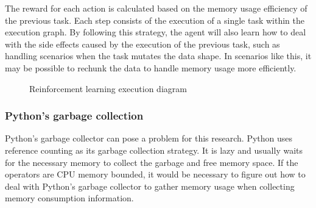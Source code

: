 The reward for each action is calculated based on the memory usage efficiency of the previous task.
Each step consists of the execution of a single task within the execution graph.
By following this strategy, the agent will also learn how to deal with the side effects caused by the execution of the previous task, such as handling scenarios when the task mutates the data shape.
In scenarios like this, it may be possible to rechunk the data to handle memory usage more efficiently.

\begin{figure}[ht]
  \caption{Reinforcement learning execution diagram}
  \label{fig:reinf-learning}
\end{figure}

\subsubsection{Python's garbage collection}

Python's garbage collector can pose a problem for this research.
Python uses reference counting as its garbage collection strategy. It is lazy and usually waits for the necessary memory to collect the garbage and free memory space.
If the operators are \ac{CPU} memory bounded, it would be necessary to figure out how to deal with Python's garbage collector to gather memory usage when collecting memory consumption information.
